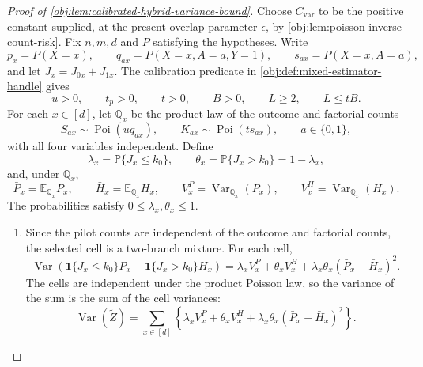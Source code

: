 \documentclass[11pt]{article}
\begin{document}
\begin{proof}[Proof of \cref{obj:lem:calibrated-hybrid-variance-bound}]
Choose \(C_{\mathrm{var}}\) to be the positive constant supplied, at the present overlap parameter \(\epsilon\), by \cref{obj:lem:poisson-inverse-count-risk}. Fix \(n,m,d\) and \(P\) satisfying the hypotheses. Write
\[
p_x=P(X=x),\qquad
q_{ax}=P(X=x,A=a,Y=1),\qquad
s_{ax}=P(X=x,A=a),
\]
and let \(J_x=J_{0x}+J_{1x}\). The calibration predicate in \cref{obj:def:mixed-estimator-handle} gives
\[
u>0,\qquad t_p>0,\qquad t>0,\qquad B>0,\qquad L\ge2,\qquad L\le tB .
\]
For each \(x\in[d]\), let \(\mathbb Q_x\) be the product law of the outcome and factorial counts
\[
S_{ax}\sim\operatorname{Poi}(u q_{ax}),\qquad
K_{ax}\sim\operatorname{Poi}(t s_{ax}),\qquad a\in\{0,1\},
\]
with all four variables independent. Define
\[
\lambda_x=\mathbb P\{J_x\le k_0\},\qquad
\theta_x=\mathbb P\{J_x>k_0\}=1-\lambda_x,
\]
and, under \(\mathbb Q_x\),
\[
\bar P_x=\mathbb E_{\mathbb Q_x}P_x,\qquad
\bar H_x=\mathbb E_{\mathbb Q_x}H_x,\qquad
V^P_x=\operatorname{Var}_{\mathbb Q_x}(P_x),\qquad
V^H_x=\operatorname{Var}_{\mathbb Q_x}(H_x).
\]
The probabilities satisfy \(0\le\lambda_x,\theta_x\le1\). %

\begin{enumerate}
\item Since the pilot counts are independent of the outcome and factorial counts, the selected cell is a two-branch mixture. For each cell,
\[
\operatorname{Var}\!\left(
\mathbf 1\{J_x\le k_0\}P_x+\mathbf 1\{J_x>k_0\}H_x
\right)
=
\lambda_x V^P_x+\theta_x V^H_x
+\lambda_x\theta_x(\bar P_x-\bar H_x)^2 .
\]
The cells are independent under the product Poisson law, so the variance of the sum is the sum of the cell variances:
\[
\operatorname{Var}(\widetilde Z)
=
\sum_{x\in[d]}
\left\{
\lambda_x V^P_x+\theta_x V^H_x
+\lambda_x\theta_x(\bar P_x-\bar H_x)^2
\right\}.
\]


\end{enumerate}
\end{proof}
\end{document}
